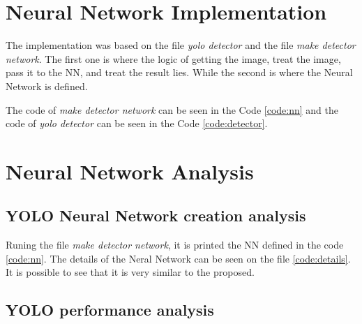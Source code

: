 \documentclass[journal]{IEEEtran}
\begin{document}
\section{Neural Network Implementation}

The implementation was based on the file \textit{yolo detector} and the file \textit{make detector network}. The first one is where the logic of getting the image, treat the image, pass it to the NN, and treat the result lies. While the second is where the Neural Network is defined.

The code of \textit{make detector network} can be seen in the Code \ref{code:nn} and the code of \textit{yolo detector} can be seen in the Code \ref{code:detector}.





\section{Neural Network Analysis}
\subsection{YOLO Neural Network creation analysis}

Runing the file \textit{make detector network}, it is printed the NN defined in the code \ref{code:nn}. The details of the Neral Network can be seen on the file \ref{code:details}. It is possible to see that it is very similar to the proposed.



\subsection{YOLO performance analysis}
\end{document}
